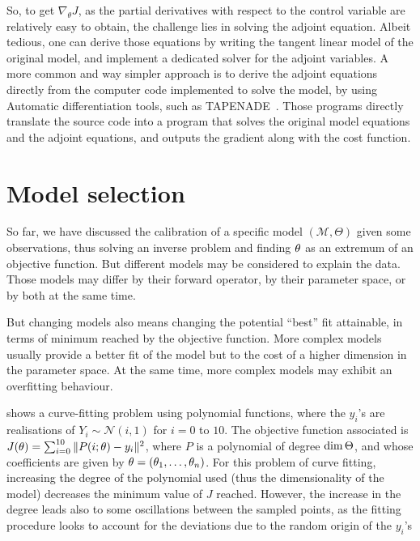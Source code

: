 \documentclass[../../Main_ManuscritThese.tex]{subfiles}
\begin{document}
So, to get $\nabla_\theta J$, as the partial derivatives with respect to the control variable are relatively easy to obtain, the challenge lies in solving the adjoint equation. Albeit tedious, one can derive those equations by writing the tangent linear model of the original model, and implement a dedicated solver for the adjoint variables. A more common and way simpler approach is to derive the adjoint equations directly from the computer code implemented to solve the model, by using Automatic differentiation tools, such as \textsc{TAPENADE}~\cite{hascoet_tapenade_2013}. Those programs directly translate the source code into a program that solves the original model equations and the adjoint equations, and outputs the gradient along with the cost function.


\section{Model selection}
\label{sec:model_selection}
So far, we have discussed the calibration of a specific model $(\mathcal{M}, \Theta)$ given some observations, thus solving an inverse problem and finding ${\theta}_{\mathrm{}}$ as an extremum of an objective function. But different models may be considered to explain the data. Those models may differ by their forward operator, by their parameter space, or by both at the same time.

But changing models also means changing the potential ``best'' fit attainable, in terms of minimum reached by the objective function.
More complex models usually provide a better fit of the model but to the cost of a higher dimension in the parameter space. At the same time, more complex models may exhibit an overfitting behaviour.

\begin{example}
 shows a curve-fitting problem using polynomial functions, where the $y_i$'s are realisations of $Y_i \sim \mathcal{N}(i, 1)$ for $i=0$ to $10$. The objective function associated is $J(\theta) = \sum_{i=0}^{10}\|P(i;\theta) - y_i\|^2$, where $P$ is a polynomial of degree $\dim \Theta$, and whose coefficients are given by $\theta = (\theta_1,\dots,\theta_n)$.
For this problem of curve fitting, increasing the degree of the polynomial used (thus the dimensionality of the model) decreases the minimum value of $J$ reached. However, the increase in the degree leads also to some oscillations between the sampled points, as the fitting procedure looks to account for the deviations due to the random origin of the $y_i$'s
\end{example}
\end{document}
